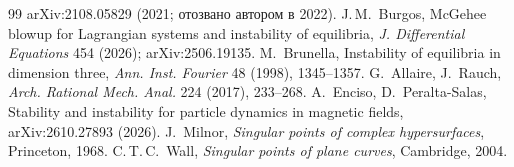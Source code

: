 \documentclass[11pt,a4paper]{article}
\theoremstyle{definition}
\begin{document}
\begin{thebibliography}{99}
arXiv:2108.05829 (2021; отозвано автором в 2022).
 J.\,M.~Burgos, McGehee blowup for Lagrangian systems and instability of
equilibria, \emph{J. Differential Equations} 454 (2026); arXiv:2506.19135.
 M.~Brunella, Instability of equilibria in dimension three, \emph{Ann. Inst.
Fourier} 48 (1998), 1345--1357.
 G.~Allaire, J.~Rauch, \emph{Arch. Rational Mech. Anal.} 224 (2017), 233--268.
 A.~Enciso, D.~Peralta-Salas, Stability and instability for particle
dynamics in magnetic fields, arXiv:2610.27893 (2026).
 J.~Milnor, \emph{Singular points of complex hypersurfaces}, Princeton, 1968.
 C.\,T.\,C.~Wall, \emph{Singular points of plane curves}, Cambridge, 2004.
\end{thebibliography}
\end{document}
